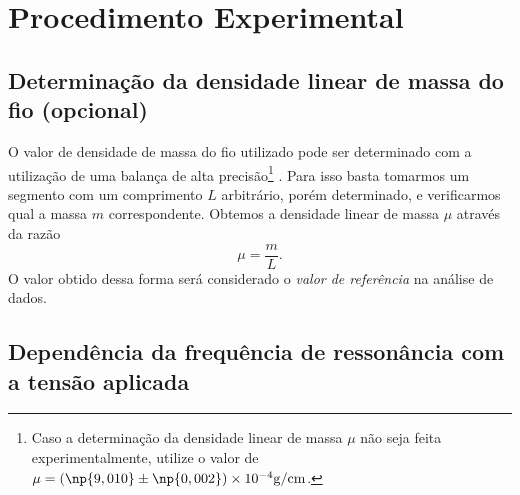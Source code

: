 \section{Procedimento Experimental}

\subsection{Determinação da densidade linear de massa do fio (opcional)}

O valor de densidade de massa do fio utilizado pode ser determinado com a utilização de uma balança de alta precisão\footnote{Caso a determinação da densidade linear de massa $\mu$  não seja feita experimentalmente, utilize o valor de $\mu = (\np{9,010} \pm \np{0,002})\times 10^{-4} \rm{g/cm}$.} . Para isso basta tomarmos um segmento com um comprimento $L$ arbitrário, porém determinado, e verificarmos qual a massa $m$ correspondente. Obtemos a densidade linear de massa $\mu$ através da razão
\begin{equation}
	\mu = \frac{m}{L}.
\end{equation}
%
O valor obtido dessa forma será considerado o \emph{valor de referência} na análise de dados.

\subsection{Dependência da frequência de ressonância com a tensão aplicada}

